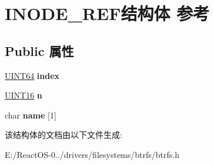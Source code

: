 \hypertarget{struct_i_n_o_d_e___r_e_f}{}\section{I\+N\+O\+D\+E\+\_\+\+R\+E\+F结构体 参考}
\label{struct_i_n_o_d_e___r_e_f}
\subsection*{Public 属性}
\begin{DoxyCompactItemize}
\item 
\mbox{\label{struct_i_n_o_d_e___r_e_f_af77737ce811ccbd5cccd43fb9fb9d948}} 
\hyperlink{_processor_bind_8h_a57be03562867144161c1bfee95ca8f7c}{U\+I\+N\+T64} {\bfseries index}
\item 
\mbox{\label{struct_i_n_o_d_e___r_e_f_a096ee927ebeb3320056f2edaf2e60b35}} 
\hyperlink{_processor_bind_8h_a09f1a1fb2293e33483cc8d44aefb1eb1}{U\+I\+N\+T16} {\bfseries n}
\item 
\mbox{\label{struct_i_n_o_d_e___r_e_f_a385c4613abc4bde7171b2e54f32db852}} 
char {\bfseries name} \mbox{[}1\mbox{]}
\end{DoxyCompactItemize}


该结构体的文档由以下文件生成\+:\begin{DoxyCompactItemize}
\item 
E\+:/\+React\+O\+S-\/0../drivers/filesystems/btrfs/btrfs.\+h\end{DoxyCompactItemize}

